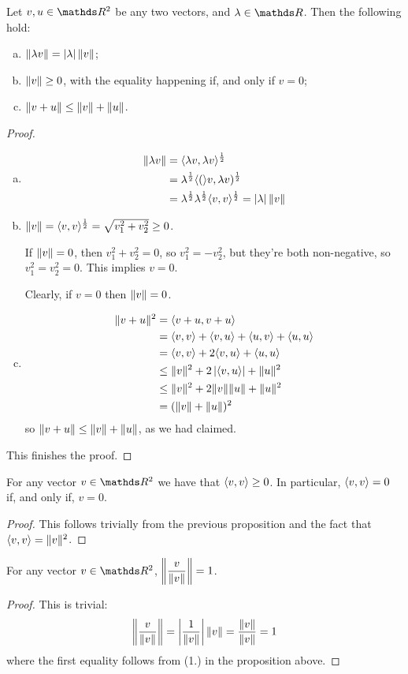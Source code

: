 \begin{prop}
	Let $v,u\in \R^2$ be any two vectors, and $\lambda \in \R$. Then the following hold:
	\begin{enumerate}[a)]
		\item $\lVert\lambda v\rVert=\left\vert\lambda\right\vert\lVert v\rVert$;
		\item $\lVert v\rVert\geq0$, with the equality happening if, and only if $v=0$;
		\item $\lVert v+u\rVert\leq \lVert v\rVert+\lVert u\rVert$.
	\end{enumerate}
\end{prop}
\begin{proof}
	\begin{enumerate}[a)]
		\item \begin{align*}
			\lVert\lambda v\rVert&=\langle \lambda v,\lambda v\rangle^{\frac{1}{2}}\\
			&=\lambda^\frac{1}{2}\langle (\rangle v,\lambda v)^{\frac{1}{2}}\\
			&=\lambda^\frac{1}{2}\lambda^\frac{1}{2}\langle v,v\rangle^\frac{1}{2}=\left\vert\lambda\right\vert\lVert v\rVert
		\end{align*}
		
		\item $\lVert v\rVert=\langle v,v\rangle^\frac{1}{2}=\sqrt{v_1^2+v_2^2}\geq 0$.
		
		If $\lVert v\rVert=0$, then $v_1^2+v_2^2=0$, so $v_1^2=-v_2^2$, but they're both non-negative, so $v_1^2=v_2^2=0$. This implies $v=0$.
		
		Clearly, if $v=0$ then $\lVert v\rVert=0$.
		
		\item \begin{align*}
			\lVert v+u\rVert^2&=\langle v+u,v+u\rangle\\
			&=\langle v,v\rangle+\langle v,u\rangle+\langle u,v\rangle+\langle u,u\rangle\\
			&=\langle v,v\rangle+2\langle v,u\rangle+\langle u,u\rangle\\
			&\leq \lVert v\rVert^2+2\left\vert\langle v,u\rangle\right\vert+\lVert u\rVert^2\\
			&\le \lVert v\rVert^2+2\lVert v\rVert\lVert u\rVert+\lVert u\rVert^2\\
			&=(\lVert v\rVert+\lVert u\rVert)^2			
		\end{align*}so $\lVert v+u\rVert\leq \lVert v\rVert+\lVert u\rVert$, as we had claimed.
	\end{enumerate}

This finishes the proof.
\end{proof}

\begin{cor}
	For any vector $v\in \R^2$ we have that $\langle v,v\rangle\geq 0$. In particular, $\langle v,v\rangle=0$ if, and only if, $v=0$.
\end{cor}
\begin{proof}
	This follows trivially from the previous proposition and the fact that $\langle v,v\rangle=\lVert v\rVert^2$.
\end{proof}
\begin{cor}
	For any vector $v\in \R^2$, $\left\Vert\dfrac{v}{\lVert v\rVert}\right\Vert=1$.
\end{cor}
\begin{proof}
	This is trivial:
	\[\left\Vert\frac{v}{\lVert v\rVert}\right\Vert=\left\vert\frac{1}{\lVert v\rVert}\right\vert\lVert v\rVert=\frac{\lVert v\rVert}{\lVert v\rVert}=1\]where the first equality follows from (1.) in the proposition above.
\end{proof}

